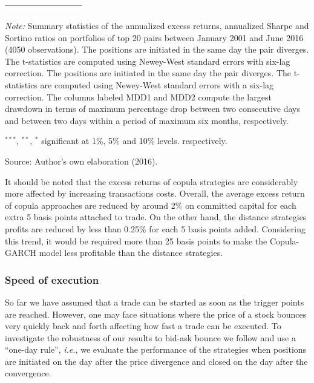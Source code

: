 \documentclass[a4paper,12pt]{report}
\begin{document}
\begin{threeparttable}[H]
\begin{tabularx}{\textwidth}{@{\extracolsep{\fill}}llllllll@{}}
		\multicolumn{1}{r}{} & \multicolumn{1}{r}{} & \multicolumn{1}{r}{} & \multicolumn{1}{r}{} & \multicolumn{1}{r}{} & \multicolumn{1}{r}{} & \multicolumn{1}{r}{} & \multicolumn{1}{r}{} \\
		\bottomrule
	\end{tabularx}%
	\begin{tablenotes}
		\item \textit{Note:} \scriptsize Summary statistics of the annualized excess returns, annualized Sharpe and Sortino ratios on portfolios of top 20 pairs between January 2001 and June 2016 (4050 observations). The positions are initiated in the same day the pair diverges. The t-statistics are computed using Newey-West standard errors with six-lag correction. The positions are initiated in the same day the pair diverges. The t-statistics are computed using Newey-West standard errors with a six-lag correction. The columns labeled MDD1 and MDD2 compute the largest drawdown in terms of maximum percentage drop between two consecutive days and between two days within a period of maximum six months, respectively.
		\item \scriptsize $^{\ast\ast\ast}$, $^{\ast\ast}$, $^{\ast}$ significant at 1\%, 5\% and 10\% levels. respectively.
		\item Source: Author's own elaboration (2016).
	\end{tablenotes}
	\label{tab:table201}%
\end{threeparttable}%

\vspace{0.6cm}

It should be noted that the excess returns of copula strategies are considerably more affected by increasing transactions costs. Overall, the average excess return of copula approaches are reduced by around 2\% on committed capital for each extra 5 basis points attached to trade. On the other hand, the distance strategies profits are reduced by less than 0.25\% for each 5 basis points added. Considering this trend, it would be required more than 25 basis points to make the Copula-GARCH model less profitable than the distance strategies.

\vspace{0.6cm}

\subsubsection{Speed of execution}

So far we have assumed that a trade can be started as soon as the trigger points are reached. However, one may face situations where the price of a stock bounces very quickly back and forth affecting how fast a trade can be executed. To investigate the robustness of our results to bid-ask bounce \citep{j90,jt95,conrad89} we follow \citet*{ggr06} and use a ``one-day rule'', \emph{i.e.}, we evaluate the performance of the strategies when positions are initiated on the day after the price divergence and closed on the day after the convergence.
\end{document}
